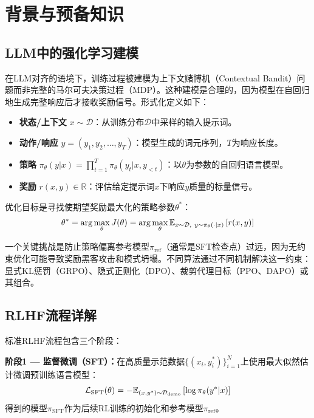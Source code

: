 \section{背景与预备知识}
\label{sec:bg}

\subsection{LLM中的强化学习建模}

在LLM对齐的语境下，训练过程被建模为上下文赌博机（Contextual Bandit）问题而非完整的马尔可夫决策过程（MDP）。这种建模是合理的，因为模型在自回归地生成完整响应后才接收奖励信号。形式化定义如下：

\begin{itemize}[leftmargin=*, itemsep=1pt]
\item \textbf{状态/上下文} $x \sim \mathcal{D}$：从训练分布$\mathcal{D}$中采样的输入提示词。
\item \textbf{动作/响应} $y = (y_1, y_2, \ldots, y_T)$：模型生成的词元序列，$T$为响应长度。
\item \textbf{策略} $\pi_\theta(y|x) = \prod_{t=1}^{T} \pi_\theta(y_t | x, y_{<t})$：以$\theta$为参数的自回归语言模型。
\item \textbf{奖励} $r(x, y) \in \mathbb{R}$：评估给定提示词$x$下响应$y$质量的标量信号。
\end{itemize}

优化目标是寻找使期望奖励最大化的策略参数$\theta^*$：
\begin{equation}
\theta^* = \arg\max_\theta J(\theta) = \arg\max_\theta \mathbb{E}_{x \sim \mathcal{D},\ y \sim \pi_\theta(\cdot|x)}\left[r(x, y)\right]
\label{eq:obj}
\end{equation}

一个关键挑战是防止策略偏离参考模型$\pi_{\text{ref}}$（通常是SFT检查点）过远，因为无约束优化可能导致奖励黑客攻击和模式坍塌。不同算法通过不同机制解决这一约束：显式KL惩罚（GRPO）、隐式正则化（DPO）、裁剪代理目标（PPO、DAPO）或其组合。

\subsection{RLHF流程详解}

标准RLHF流程包含三个阶段：

\textbf{阶段1 --- 监督微调（SFT）：}在高质量示范数据$\{(x_i, y_i^*)\}_{i=1}^{N}$上使用最大似然估计微调预训练语言模型：
\begin{equation}
\mathcal{L}_{\text{SFT}}(\theta) = -\mathbb{E}_{(x,y^*) \sim \mathcal{D}_{\text{demo}}}\left[\log \pi_\theta(y^*|x)\right]
\end{equation}
得到的模型$\pi_{\text{SFT}}$作为后续RL训练的初始化和参考模型$\pi_{\text{ref}}$。

